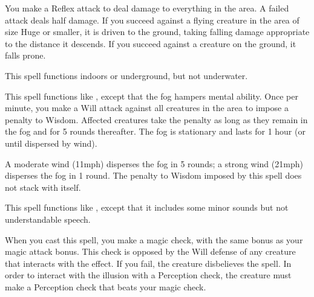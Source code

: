 \begin{spelleffect}
    You make a Reflex attack to deal damage to everything in the area. A failed attack deals half damage. If you succeed against a flying creature in the area of size Huge or smaller, it is driven to the ground, taking falling damage appropriate to the distance it descends. If you succeed against a creature on the ground, it falls prone.
\end{spelleffect}
\begin{spellnotes}
    This spell functions indoors or underground, but not underwater.
\end{spellnotes}

\begin{spelleffect}
    This spell functions like , except that the fog hampers mental ability. Once per minute, you make a Will attack against all creatures in the area to impose a  penalty to Wisdom. Affected creatures take the penalty as long as they remain in the fog and for 5 rounds thereafter. The fog is stationary and lasts for 1 hour (or until dispersed by wind).
\end{spelleffect}
\begin{spellnotes}
    A moderate wind (11\add mph) disperses the fog in 5 rounds; a strong wind (21\add mph) disperses the fog in 1 round. The penalty to Wisdom imposed by this spell does not stack with itself.
\end{spellnotes}

\begin{spelleffect}
    This spell functions like , except that it includes some minor sounds but not understandable speech.
\end{spelleffect}
\begin{spellnotes}
    When you cast this spell, you make a magic check, with the same bonus as your magic attack bonus. This check is opposed by the Will defense of any creature that interacts with the effect. If you fail, the creature disbelieves the spell. In order to interact with the illusion with a Perception check, the creature must make a Perception check that beats your magic check.
\end{spellnotes}

